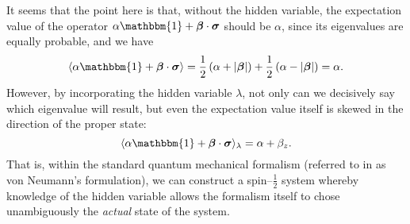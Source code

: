 \documentclass[12pt]{article}
\begin{document}
It seems that the point here is that, without the hidden variable, the expectation value of the operator $\alpha \mathbbm{1} + \bm{\beta} \cdot \bm{\sigma}$ should be $\alpha$, since its eigenvalues are equally probable, and we have
\begin{displaymath}
  \langle \alpha \mathbbm{1} + \bm{\beta} \cdot \bm{\sigma} \rangle
  = \frac{1}{2} \left( \alpha + |\bm{\beta}| \right) + \frac{1}{2} \left( \alpha - |\bm{\beta}| \right)
  = \alpha.
\end{displaymath}
However, by incorporating the hidden variable $\lambda$, not only can we decisively say which eigenvalue will result, but even the expectation value itself is skewed in the direction of the proper state:
\begin{displaymath}
  \langle \alpha \mathbbm{1} + \bm{\beta} \cdot \bm{\sigma} \rangle_{\lambda} = \alpha + \beta_z.
\end{displaymath}
That is, within the standard quantum mechanical formalism (referred to in \cite{Bell1966} as von Neumann's formulation), we can construct a spin--$\frac{1}{2}$ system whereby knowledge of the hidden variable allows the formalism itself to chose unambiguously the \emph{actual} state of the system.



\end{document}
